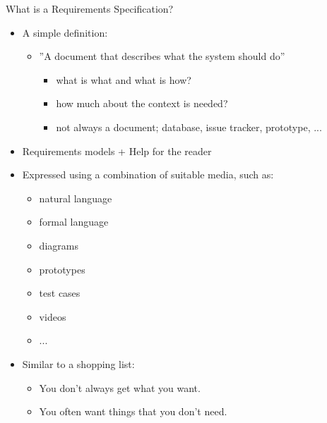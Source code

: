 
\begin{Slide}{What is a Requirements Specification?}

\begin{itemize}
\item A simple definition:  
\begin{itemize}
\item ''A document that describes what the system should do''
\begin{itemize}
\item what is what and what is how?
\item how much about the context is needed?
\item not always a document; database, issue tracker, prototype, ...

\end{itemize}
\end{itemize}
\item Requirements models + Help for the reader

\item Expressed using a combination of suitable media, such as:
\begin{itemize}
\item natural language
\item formal language
\item diagrams
\item prototypes
\item test cases
\item videos
\item ...

\end{itemize}
\item Similar to a shopping list:
\begin{itemize}
\item You don't always get what you want.
\item You often want things that you don't need.


\end{itemize}
\end{itemize}
\end{Slide}